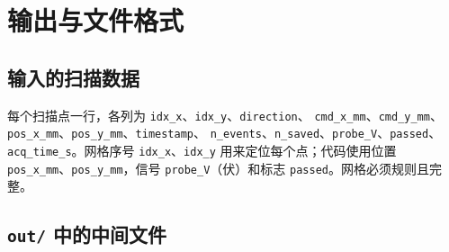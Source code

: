 \documentclass[11pt,a4paper,fontset=fandol]{ctexart}
\newcommand{\code}[1]{\texttt{#1}}
\begin{document}
\section{输出与文件格式}

\subsection{输入的扫描数据}

 每个扫描点一行，各列为 \code{idx\_x}、\code{idx\_y}、\code{direction}、
\code{cmd\_x\_mm}、\code{cmd\_y\_mm}、\code{pos\_x\_mm}、\code{pos\_y\_mm}、\code{timestamp}、
\code{n\_events}、\code{n\_saved}、\code{probe\_V}、\code{passed}、\code{acq\_time\_s}。网格序号
\code{idx\_x}、\code{idx\_y} 用来定位每个点；代码使用位置 \code{pos\_x\_mm}、\code{pos\_y\_mm}，信号
\code{probe\_V}（伏）和标志 \code{passed}。网格必须规则且完整。

\subsection{\texttt{out/} 中的中间文件}
\end{document}
